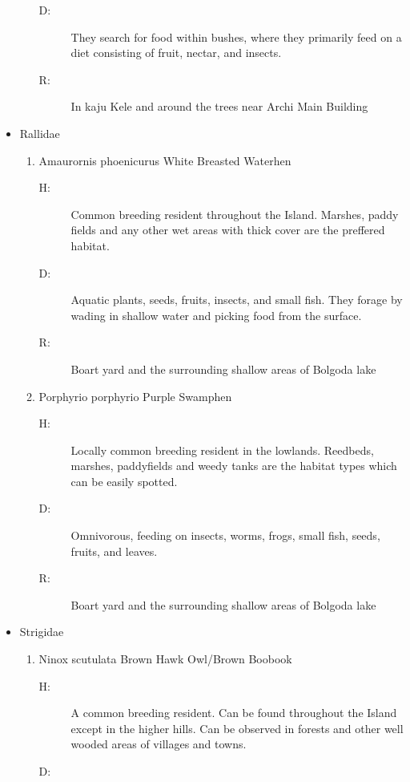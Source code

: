 \begin{itemize}
\begin{enumerate}
\begin{description}
\item[D: ]%
They search for food within bushes, where they primarily feed on a diet consisting of fruit, nectar, and insects.%
\item[R: ]%
In kaju Kele and around the trees near Archi Main Building%
\end{description}%
\end{enumerate}%
\item%
Rallidae%
\begin{enumerate}%
\item%
Amaurornis phoenicurus\newline%
White Breasted Waterhen%
\begin{description}%
\item[H: ]%
Common breeding resident throughout the Island. Marshes, paddy fields and any other wet areas with thick cover are the preffered habitat.%
\item[D: ]%
Aquatic plants, seeds, fruits, insects, and small fish. They forage by wading in shallow water and picking food from the surface.%
\item[R: ]%
Boart yard and the surrounding shallow areas of Bolgoda lake%
\end{description}%
\item%
Porphyrio porphyrio\newline%
Purple Swamphen%
\begin{description}%
\item[H: ]%
Locally common breeding resident in the lowlands. Reedbeds, marshes, paddyfields and weedy tanks are the habitat types which can be easily spotted.%
\item[D: ]%
 Omnivorous, feeding on insects, worms, frogs, small fish, seeds, fruits, and leaves.%
\item[R: ]%
Boart yard and the surrounding shallow areas of Bolgoda lake%
\end{description}%
\end{enumerate}%
\item%
Strigidae%
\begin{enumerate}%
\item%
Ninox scutulata\newline%
Brown Hawk Owl/Brown Boobook%
\begin{description}%
\item[H: ]%
A common breeding resident. Can be found throughout the Island except in the higher hills. Can be observed in forests and other well wooded areas of villages and towns. %
\item[D: ]%

\end{description}
\end{enumerate}
\end{itemize}

